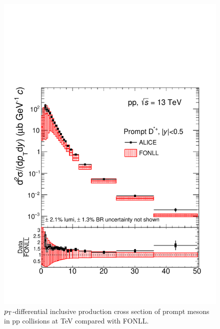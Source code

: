 \begin{figure}[tb]
\begin{center}
\includegraphics[width=1\textwidth]{figures/Dstar/pp13TeV/cross-section-pp13TeV-final-systematics.pdf}
\caption{$p_{\rm T}$-differential inclusive production cross section of prompt \Dstar mesons in pp collisions at  TeV compared with FONLL.}
\label{fig:DmesonCorrYieldsModel}
\end{center}
\end{figure}
